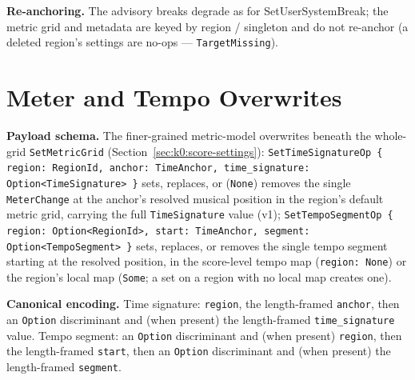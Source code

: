 \documentclass[11pt,letterpaper]{report}
\begin{document}
\textbf{Re-anchoring.} The advisory breaks degrade as for SetUserSystemBreak; the
metric grid and metadata are keyed by region / singleton and do not re-anchor (a
deleted region's settings are no-ops --- \texttt{TargetMissing}).

\section{Meter and Tempo Overwrites}
\label{sec:k0:meter-tempo}

\textbf{Payload schema.} The finer-grained metric-model overwrites beneath the
whole-grid \texttt{SetMetricGrid} (Section~\ref{sec:k0:score-settings}):
\texttt{SetTimeSignatureOp \{ region: RegionId, anchor: TimeAnchor,
time\_signature: Option<TimeSignature> \}} sets, replaces, or (\texttt{None})
removes the single \texttt{MeterChange} at the anchor's resolved musical
position in the region's default metric grid, carrying the full
\texttt{TimeSignature} value (v1); \texttt{SetTempoSegmentOp \{ region:
Option<RegionId>, start: TimeAnchor, segment: Option<TempoSegment> \}} sets,
replaces, or removes the single tempo segment starting at the resolved
position, in the score-level tempo map (\texttt{region: None}) or the region's
local map (\texttt{Some}; a set on a region with no local map creates one).

\textbf{Canonical encoding.} Time signature: \texttt{region}, the
length-framed \texttt{anchor}, then an \texttt{Option} discriminant and (when
present) the length-framed \texttt{time\_signature} value. Tempo segment: an
\texttt{Option} discriminant and (when present) \texttt{region}, then the
length-framed \texttt{start}, then an \texttt{Option} discriminant and (when
present) the length-framed \texttt{segment}.
\end{document}
